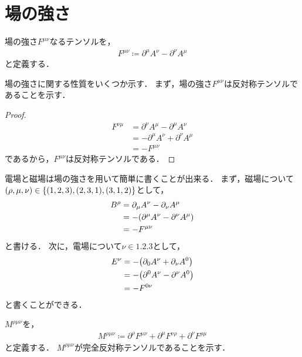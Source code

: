 \documentclass{report}
\begin{document}
  \section{場の強さ}
    場の強さ$F^{\mu\nu}$なるテンソルを，
    \begin{align}
      F^{\mu\nu} \coloneqq \partial^{\mu}A^{\nu} - \partial^{\nu}A^{\mu}
    \end{align}
    と定義する．
    \par
    場の強さに関する性質をいくつか示す．
    まず，場の強さ$F^{\mu\nu}$は反対称テンソルであることを示す．
    \begin{proof}
      \begin{align}
        F^{\nu\mu} &= \partial^{\nu}A^{\mu} - \partial^{\mu}A^{\nu} \\ 
        &= -\partial^{\mu}A^{\nu} + \partial^{\nu}A^{\mu} \\ 
        &= -F^{\mu\nu}
      \end{align}
      であるから，$F^{\mu\nu}$は反対称テンソルである．
    \end{proof}
    電場と磁場は場の強さを用いて簡単に書くことが出来る．
    まず，磁場について$(\rho, \mu, \nu) \in \qty{(1, 2, 3), (2, 3, 1), (3, 1, 2)}$として，
    \begin{align}
      B^{\rho} &= \partial_{\mu}A^{\nu} - \partial_{\nu}A^{\mu} \\ 
      &= -\qty(\partial^{\mu}A^{\nu} - \partial^{\nu}A^{\mu}) \\ 
      &= -F^{\mu\nu} \label{b-field-strength}
    \end{align}
    と書ける．
    次に，電場について$\nu \in \qty{1, 2, 3}$として，
    \begin{align}
      E^{\nu} &= -\qty(\partial_0A^{\nu} + \partial_{\nu}A^0) \\ 
      &= -\qty(\partial^0A^{\nu} - \partial^{\nu}A^0) \\ 
      &= -F^{0\nu} \label{e-field-strength}
    \end{align}
    と書くことができる．
    \par
    $M^{\rho\mu\nu}$を，
    \begin{align}
      M^{\rho\mu\nu} \coloneqq \partial^{\rho}F^{\mu\nu} + \partial^{\mu}F^{\nu\rho} + \partial^{\nu}F^{\rho\mu}
    \end{align}
    と定義する．
    $M^{\rho\mu\nu}$が完全反対称テンソルであることを示す．
\end{document}
